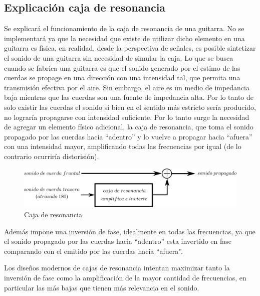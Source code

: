 \documentclass[assd_tp2_main.tex]{subfiles}
\begin{document}
\subsection{Explicación caja de resonancia}
Se explicará el funcionamiento de la caja de resonancia de una guitarra. No se implementar\'a ya que la necesidad que existe de utilizar dicho elemento en una guitarra es física, en realidad, desde la perspectiva de señales, es posible sintetizar el sonido de una guitarra sin necesidad de simular la caja.
Lo que se busca cuando se fabrica una guitarra es que el sonido generado por el estimo de las cuerdas se propage en una dirección con una intensidad tal, que permita una transmisión efectiva por el aire.
Sin embargo, el aire es un medio de impedancia baja mientras que las cuerdas son una fuente de impedancia alta. Por lo tanto de solo existir las cuerdas el sonido si bien en el sentido más estricto sería producido, no lograría propagarse con intensidad suficiente. 
Por lo tanto surge la necesidad de agregar un elemento f\'isico adicional, la caja de resonancia, que toma el sonido propagado por las cuerdas hacia ``adentro'' y lo vuelve a propagar hacia ``afuera'' con una intensidad mayor, amplificando todas las frecuencias por igual (de lo contrario ocurrir\'ia distorisi\'on). 
\begin{figure}[H]
	\begin{center}
	\includegraphics[scale=1.2]{graficos/caja_resonancia.png}
	\caption{Caja de resonancia}

	\end{center}
\end{figure}
Además impone una inversi\'on de fase, idealmente en todas las frecuencias, ya que el sonido propagado por las cuerdas hacia ``adentro'' esta invertido en fase comparando con el emitido por las cuerdas hacia ``afuera''.\par
Los dise\~nos modernos de cajas de resonancia intentan maximizar tanto la inversión de fase como la amplificación de la mayor cantidad de frecuencias, en particular las m\'as bajas que tienen m\'as relevancia en el sonido.
\end{document}
